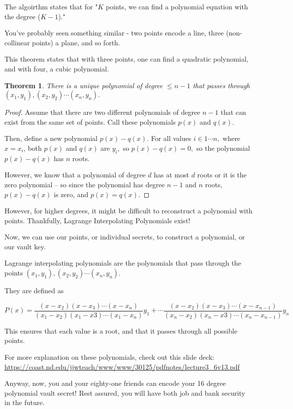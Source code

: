 \documentclass{article}
\newtheorem{theorem}{Theorem}
\theoremstyle{remark}
\theoremstyle{problem}
\numberwithin{problem}{subsection}
\numberwithin{Problem}{section}
\theoremstyle{definition}
\theoremstyle{definition}
\begin{document}
The algoirthm states that for "$K$ points, we can find a polynomial equation with the degree ($K - 1$)."

You've probably seen something similar - two points encode a line, three (non-collinear points) a plane, and so forth. 

This theorem states that with three points, one can find a quadratic polynomial, and with four, a cubic polynomial. 

\begin{theorem}
    There is a unique polynomial of degree $ \leq n-1$ that passes through $(x_1, y_1), (x_2, y_2) \cdots (x_n, y_n).$
\end{theorem}

\begin{proof}
    Assume that there are two different polynomials of degree $n-1$ that can exist from the same set of points. Call these polynomials $p(x)$ and $q(x).$

    Then, define a new polynomial $p(x) - q(x).$ For all values $i \in {1 \cdots n},$ where $x = x_i$, both $p(x)$ and $q(x)$ are $y_i,$ so $p(x) - q(x) = 0,$ so the polynomial $p(x) - q(x)$ has $n$ roots. 

    However, we know that a polynomial of degree $d$ has at most $d$ roots or it is the zero polynomial -- so since the polynomial has degree $n-1$ and $n$ roots, $p(x) - q(x)$ is zero, and $p(x) = q(x).$
\end{proof}

However, for higher degrees, it might be difficult to reconstruct a polynomial with points. Thankfully, Lagrange Interpolating Polynomials exist! 

Now, we can use our points, or individual secrets, to construct a polynomial, or our vault key. 

Lagrange interpolating polynomials are the polynomials that pass through the points $(x_1, y_1), (x_2, y_2) \cdots (x_n, y_n).$

They are defined as 

$$P(x) = \frac{(x - x_2)(x - x_3)\cdots(x-x_n)}{(x_1 - x_2)(x_1 - x3)\cdots (x_1 - x_n)} y_1 + \cdots \frac{(x - x_2)(x - x_3)\cdots(x-x_{n-1})}{(x_n - x_2)(x_n - x3)\cdots (x_n - x_{n-1})} y_n $$

This ensures that each value is a root, and that it passes through all possible points. 

For more explanation on these polynomials, check out this slide deck: \url{https://coast.nd.edu/jjwteach/www/www/30125/pdfnotes/lecture3_6v13.pdf}

Anyway, now, you and your eighty-one friends can encode your 16 degree polynomial vault secret! Rest assured, you will have both job and bank security in the future. 
\end{document}
